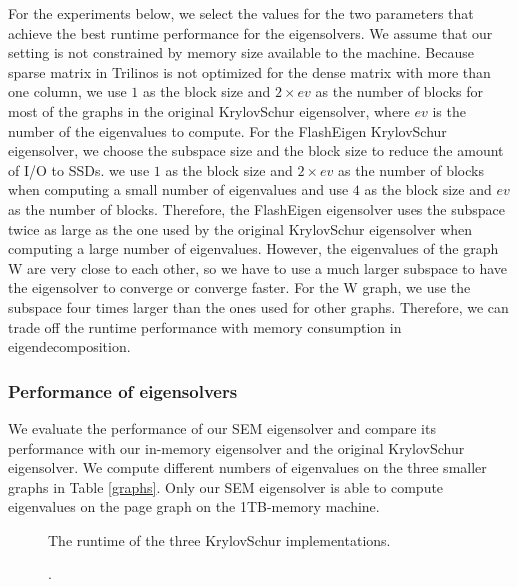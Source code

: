 For the experiments below, we select the values for the two parameters that
achieve the best runtime performance for the eigensolvers. We assume that
our setting is not constrained by memory size available to the machine.
Because sparse matrix in Trilinos is not optimized for
the dense matrix with more than one column, we use $1$ as the block size and
$2 \times ev$ as the number of blocks for most of the graphs in the original
KrylovSchur eigensolver, where $ev$ is the number of the eigenvalues to compute.
For the FlashEigen KrylovSchur eigensolver, we choose the subspace size and
the block size to reduce the amount of I/O to SSDs. we use $1$ as the block size and
$2 \times ev$ as the number of blocks when computing a small number of eigenvalues
and use $4$ as the block size and $ev$ as the number of blocks. Therefore,
the FlashEigen eigensolver uses the subspace twice as large as the one used by
the original KrylovSchur eigensolver when computing a large number of eigenvalues.
However, the eigenvalues of the graph W are very close to each other, so we have
to use a much larger subspace to have the eigensolver to converge or converge
faster. For the W graph, we use the subspace four times larger than the ones
used for other graphs. Therefore, we can trade off the runtime performance
with memory consumption in eigendecomposition.

\subsubsection{Performance of eigensolvers}

We evaluate the performance of our SEM eigensolver and compare its performance
with our in-memory eigensolver and the original KrylovSchur eigensolver.
We compute different numbers of eigenvalues on the three smaller graphs in
Table \ref{graphs}. Only our SEM eigensolver is able to compute eigenvalues
on the page graph on the 1TB-memory machine.

\begin{figure}
	\begin{center}
		\footnotesize
		\vspace{-15pt}
		
		\vspace{-15pt}
		\caption{The runtime of the three KrylovSchur implementations.}
		\label{perf:eigen_rt}
	\end{center}
\end{figure}

\begin{figure}
	\begin{center}
		\footnotesize
		\vspace{-15pt}
		
		\vspace{-15pt}
		\caption{.}
		\label{perf:eigen_decompose}
	\end{center}
\end{figure}


